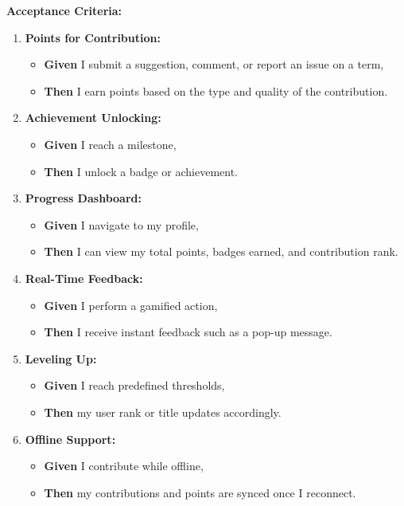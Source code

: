 \documentclass[12pt]{article}
\begin{document}
\vspace{1em}
\textbf{Acceptance Criteria:}
\begin{enumerate}
    \item \textbf{Points for Contribution:}
    \begin{itemize}
        \item \textbf{Given} I submit a suggestion, comment, or report an issue on a term,
        \item \textbf{Then} I earn points based on the type and quality of the contribution.
    \end{itemize}
    
    \item \textbf{Achievement Unlocking:}
    \begin{itemize}
        \item \textbf{Given} I reach a milestone,
        \item \textbf{Then} I unlock a badge or achievement.
    \end{itemize}

    \item \textbf{Progress Dashboard:}
    \begin{itemize}
        \item \textbf{Given} I navigate to my profile,
        \item \textbf{Then} I can view my total points, badges earned, and contribution rank.
    \end{itemize}

    \item \textbf{Real-Time Feedback:}
    \begin{itemize}
        \item \textbf{Given} I perform a gamified action,
        \item \textbf{Then} I receive instant feedback such as a pop-up message.
    \end{itemize}

    \item \textbf{Leveling Up:}
    \begin{itemize}
        \item \textbf{Given} I reach predefined thresholds,
        \item \textbf{Then} my user rank or title updates accordingly.
    \end{itemize}

    \item \textbf{Offline Support:}
    \begin{itemize}
        \item \textbf{Given} I contribute while offline,
        \item \textbf{Then} my contributions and points are synced once I reconnect.
    \end{itemize}
\end{enumerate}
\end{document}

